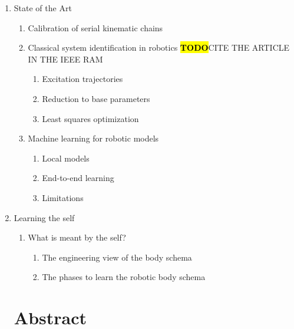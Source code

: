 \documentclass[12pt, a4paper]{article}
\newcommand{\TODO}{\hl{\textbf{TODO}}}
\begin{document}
\begin{enumerate}
	\item State of the Art
	\begin{enumerate}
		\item Calibration of serial kinematic chains  
		\item Classical system identification in robotics
		\newline\TODO CITE THE ARTICLE IN THE IEEE RAM
		
		\begin{enumerate}
			\item Excitation trajectories
			\item Reduction to base parameters
			\item Least squares optimization
		\end{enumerate}
		
		\item Machine learning for robotic models
		\begin{enumerate}
			\item Local models
			\item End-to-end learning
			\item Limitations
		\end{enumerate}	
	\end{enumerate}
	
	\item Learning the self
		\begin{enumerate}
			\item What is meant by the self?
			\begin{enumerate}
				\item The engineering view of the body schema
				\item The phases to learn the robotic body schema
			\end{enumerate}

		
\end{enumerate}

\section*{Abstract}


\end{enumerate}
\end{document}
